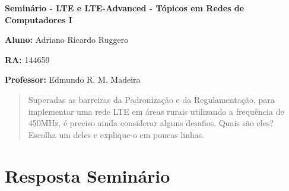 \documentclass[12pt,twoside,a4paper]{article}
\begin{document}
\vskip 15mm

\begin{center} 
\textbf{Seminário  - LTE e LTE-Advanced - Tópicos em Redes de Computadores I}

\end{center}

\vskip 5mm

\textbf{Aluno:} Adriano Ricardo Ruggero

\textbf{RA:} 144659

\textbf{Professor:} Edmundo R. M. Madeira

\vskip 20mm

\begin{abstract}

Superadas as barreiras da Padronização e da Regulamentação, para implementar uma rede LTE em áreas rurais utilizando a frequência de 450MHz, é preciso ainda considerar alguns desafios. Quais são eles? Escolha um deles e explique-o em poucas linhas.

\end{abstract}

\newpage
\pagestyle{plain}
\headheight 0.0cm
\headsep 0.0cm
\footskip 2.2cm

\section{Resposta Seminário}
\label{sec:01}




\end{document}
